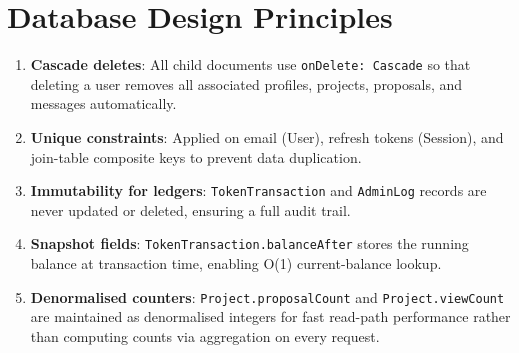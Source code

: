 \section{Database Design Principles}

\begin{enumerate}
  \item \textbf{Cascade deletes}: All child documents use \texttt{onDelete: Cascade} so that deleting a user removes all associated profiles, projects, proposals, and messages automatically.
  \item \textbf{Unique constraints}: Applied on email (User), refresh tokens (Session), and join-table composite keys to prevent data duplication.
  \item \textbf{Immutability for ledgers}: \texttt{TokenTransaction} and \texttt{AdminLog} records are never updated or deleted, ensuring a full audit trail.
  \item \textbf{Snapshot fields}: \texttt{TokenTransaction.balanceAfter} stores the running balance at transaction time, enabling O(1) current-balance lookup.
  \item \textbf{Denormalised counters}: \texttt{Project.proposalCount} and \texttt{Project.viewCount} are maintained as denormalised integers for fast read-path performance rather than computing counts via aggregation on every request.
\end{enumerate}
